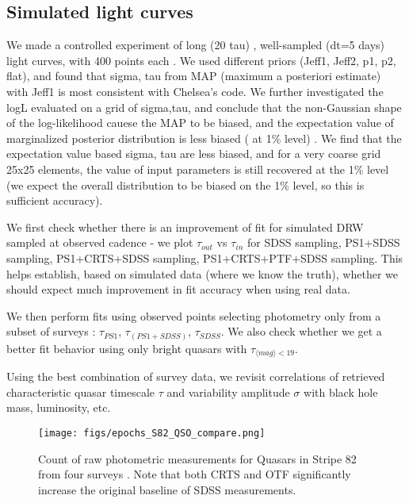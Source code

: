 \documentclass[fleqn,usenatbib]{mnras}  %
\begin{document}
\subsection{Simulated light curves}
We made a controlled experiment of long (20 tau) , well-sampled (dt=5 days) light curves,  with 400 points each . We used different priors (Jeff1, Jeff2, p1, p2, flat), and found that  sigma, tau from MAP (maximum a posteriori estimate) with Jeff1 is most consistent with Chelsea's code. We further investigated the logL evaluated on  a grid of sigma,tau, and conclude that the non-Gaussian shape of  the log-likelihood cauese the MAP to be biased, and the expectation value of marginalized posterior distribution is less biased  ( at 1\% level) . We find that the expectation value based sigma, tau are less biased, and for a very coarse grid 25x25 elements, the value of input parameters is  still recovered at the 1\% level (we expect the overall distribution to be biased on the 1\% level, so this is sufficient accuracy). 



We first check whether there is an improvement of fit for simulated DRW sampled at observed cadence - we plot $\tau_{out}$ vs $\tau_{in}$  for    SDSS sampling,    PS1+SDSS sampling,  PS1+CRTS+SDSS sampling,   PS1+CRTS+PTF+SDSS sampling.  This helps establish, based on simulated data (where we know the truth), whether we should expect much improvement in fit accuracy when using real data. 

We then perform fits using observed points selecting photometry only from a subset of surveys : $\tau_{PS1}$, $\tau_{(PS1+SDSS)}$,  $\tau_{SDSS}$.  We also check whether we get a better fit  behavior using only bright quasars with   $\tau_{\langle mag\rangle<19}$.

Using the best combination of survey data,  we revisit \cite{macleod2011} correlations of retrieved characteristic quasar timescale $\tau$ and variability amplitude $\sigma$ with black hole mass, luminosity, etc.  

\begin{figure}
\texttt{[image: figs/epochs\_S82\_QSO\_compare.png]}
\caption{Count  of raw photometric measurements for Quasars in Stripe 82 from four surveys . Note that both CRTS and OTF significantly increase the original baseline of SDSS measurements.}
\label{fig:baselines}
\end{figure} 









\bsp	%
\label{lastpage}
\end{document}
